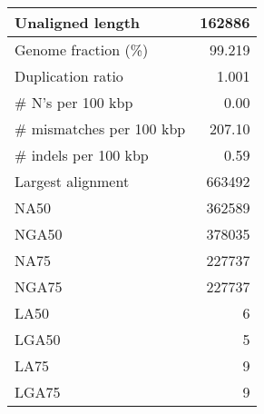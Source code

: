 \documentclass[12pt,a4paper]{article}
\begin{document}
\begin{table}[ht]
\begin{center}
\begin{tabular}{|l*{1}{|r}|}
Unaligned length & 162886 \\ \hline
Genome fraction (\%) & 99.219 \\ \hline
Duplication ratio & 1.001 \\ \hline
\# N's per 100 kbp & 0.00 \\ \hline
\# mismatches per 100 kbp & 207.10 \\ \hline
\# indels per 100 kbp & 0.59 \\ \hline
Largest alignment & 663492 \\ \hline
NA50 & 362589 \\ \hline
NGA50 & 378035 \\ \hline
NA75 & 227737 \\ \hline
NGA75 & 227737 \\ \hline
LA50 & 6 \\ \hline
LGA50 & 5 \\ \hline
LA75 & 9 \\ \hline
LGA75 & 9 \\ \hline
\end{tabular}
\end{center}
\end{table}
\end{document}
